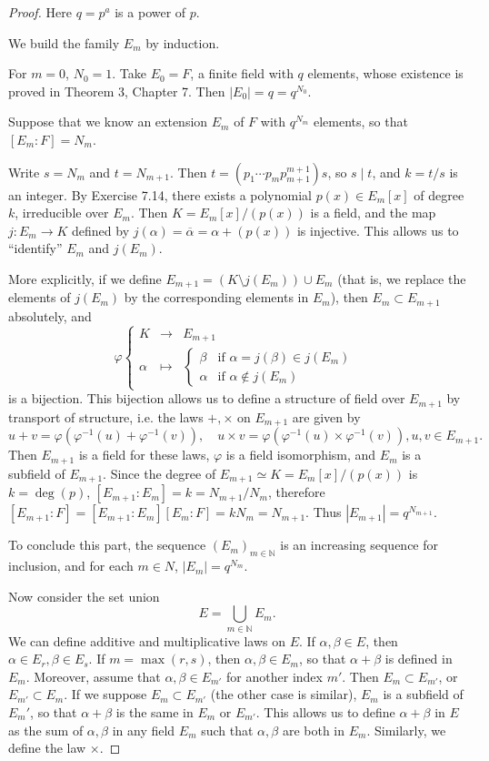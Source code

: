 \documentclass[11pt,a4paper]{article}
\newcommand{\N}{\mathbb{N}}
\begin{document}
\begin{proof}
Here $q = p^a$ is a power of $p$.

We build the family $E_m$ by induction. 

For $m = 0$, $N_0 = 1$. Take $E_0 = F$, a finite field with $q$ elements, whose existence is proved in Theorem 3, Chapter 7. Then $|E_0| = q = q^{N_0}$.

Suppose that we know an extension $E_m$ of $F$ with $q^{N_m}$ elements, so that $[E_m : F] = N_m$.

Write $s = N_m$ and $t = N_{m+1}$. Then $t= \left (p_1\cdots p_m p_{m+1}^{m+1}\right) s$, so $s \mid t$, and $k = t/s$ is an integer. 
By Exercise 7.14, there exists a polynomial $p(x) \in E_m[x]$ of degree $k$, irreducible over $E_m$. Then $K = E_m[x]/(p(x))$ is a field, and the map $j : E_m \to K$ defined by $j(\alpha) = \overline{\alpha} = \alpha + (p(x))$ is injective. This allows us to ``identify'' $E_m$ and $j(E_m)$. 

More explicitly, if we define $E_{m+1} = (K \setminus j(E_m)) \cup E_m$ (that is, we replace the elements of $j(E_m)$ by the corresponding elements in $E_m$), then $E_m \subset E_{m+1}$ absolutely, and
$$
\varphi
\left\{
\begin{array}{ccl}
K &\to& E_{m+1}\\
\alpha & \mapsto & 
	\left\{
	\begin{array}{ll}
	\beta &\text{if } \alpha = j(\beta) \in j(E_m)\\
	\alpha & \text{if } \alpha \not \in j(E_m)
	\end{array}
	\right.
\end{array}
\right.
$$
is a bijection. This bijection allows us to define a structure of field over $E_{m+1}$ by transport of structure, i.e. the laws $+, \times$ on $E_{m+1}$ are given by
$$u + v = \varphi(\varphi^{-1}(u) +\varphi^{-1}(v)),\quad u \times v = \varphi(\varphi^{-1}(u) \times \varphi^{-1}(v)), u,v \in E_{m+1}.$$
Then $E_{m+1}$ is a field for these laws, $\varphi$ is a field isomorphism, and $E_m$ is a subfield of $E_{m+1}$. Since the degree of $E_{m+1} \simeq K = E_m[x]/(p(x))$ is $k = \deg(p)$, $[E_{m+1} : E_m] = k = N_{m+1}/N_m$, therefore $[E_{m+1} : F ] = [E_{m+1} : E_m] [E_m:F] = k N_m = N_{m+1}$. Thus $|E_{m+1}| = q^{N_{m+1}}$.

 To conclude this part, the sequence $(E_m)_{m\in \N}$ is an increasing sequence for inclusion, and for each $m\in N$, $|E_m| = q^{N_m}$.

\bigskip
Now consider the set union
$$E = \bigcup_{m \in \N} E_m.$$
We can define additive and multiplicative laws on $E$. If $\alpha, \beta \in E$, then $\alpha \in E_r, \beta \in E_s$. If $m = \max(r,s)$, then $\alpha, \beta \in E_m$, so that $\alpha + \beta$ is defined in $E_m$. Moreover, assume that $\alpha, \beta \in E_{m'}$ for another index $m'$. Then $E_m \subset E_{m'}$, or $E_{m'} \subset E_m$. If we suppose $E_m \subset E_{m'}$ (the other case is similar), $E_m$ is a subfield of $E_m'$, so that $\alpha + \beta$ is the same in $E_m$ or $E_{m'}$. This allows us to define $\alpha + \beta$ in $E$ as the sum of $\alpha , \beta$ in any field $E_m$ such that $\alpha, \beta$ are both in $E_m$. Similarly, we define the law $\times$. 


\end{proof}
\end{document}
